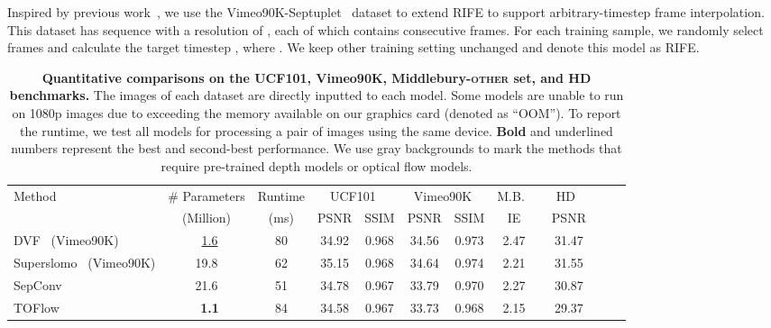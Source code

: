 \documentclass[final]{cvpr}
\def\red#1{\textcolor{MyRed}{#1}}
\def\blue#1{\textcolor{MyBlue}{#1}}
\def\first#1{\red{\textbf{#1}}}
\def\second#1{\blue{\underline{#1}}}
\begin{document}
Inspired by previous work~\cite{kalluri2020flavr, cheng2020multiple}, we use the Vimeo90K-Septuplet~\cite{xue2019video} dataset to extend RIFE to support arbitrary-timestep frame interpolation. This dataset has  sequence with a resolution of , each of which contains  consecutive frames. For each training sample, we randomly select  frames  and calculate the target timestep , where . We keep other training setting unchanged and denote this model as RIFE.  	
\begin{table*}
\caption{
		\textbf{Quantitative comparisons on the UCF101, Vimeo90K, Middlebury-\textsc{other} set, and HD benchmarks.} The images of each dataset are directly inputted to each model. Some models are unable to run on 1080p images due to exceeding the memory available on our graphics card (denoted as “OOM”). To report the runtime, we test all models for processing a pair of  images using the same device. \first{Bold} and \blue{underlined} numbers represent the best and second-best performance. We use gray backgrounds to mark the methods that require pre-trained depth models or optical flow models.
	}
\centering
	\begin{tabular}{lcccccccccc}
		\toprule
\multirow{2}{*}[-0.28em]{Method}  &\# Parameters&
		Runtime
&\multicolumn{2}{c}{UCF101~\cite{soomro2012ucf101}} &\multicolumn{2}{c}{Vimeo90K~\cite{xue2019video}} & M.B.~\cite{baker2011database} & ~~HD~\cite{bao2019depth}~~\\


		
		\cmidrule(l{7pt}r{7pt}){4-5}
		\cmidrule(l{7pt}r{7pt}){6-7}
		\cmidrule(l{5pt}r{5pt}){8-8}
		\cmidrule(l{5pt}r{5pt}){9-9}
\vspace{0.2em}
		&(Million) & (ms) &PSNR & SSIM 	&PSNR & SSIM & IE & PSNR\\
		\addlinespace[-1pt]
		\midrule




			DVF~\cite{xue2019video} (Vimeo90K) &~\second{1.6} &80 & {34.92} & {0.968} &{34.56}& {0.973}  &{2.47} & 31.47 \\
		
		Superslomo~\cite{jiang2018super} (Vimeo90K) &19.8 &62 & {35.15} & {0.968} &{34.64}& {0.974}  &{2.21} & 31.55\\
		
		SepConv~\cite{niklaus2017video} & 21.6 & 51 & 34.78 & 0.967  &33.79& {0.970} &2.27& 30.87 \\
		
		TOFlow~\cite{baker2011database} &~\first{1.1} &84 & 34.58 & 0.967  &33.73& 0.968 &2.15 &29.37  \\
		

\end{tabular}
\end{table*}
\end{document}
